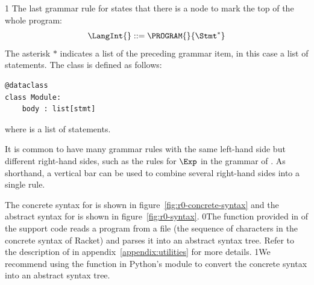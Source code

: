 \documentclass[7x10]{TimesAPriori_MIT}%
\def\racketEd{0}
\def\pythonEd{1}
\def\edition{1}
\newcommand{\racket}[1]{{\if\edition\racketEd{#1}\fi}}
\newcommand{\pythonColor}[0]{}
\newcommand{\python}[1]{{\if\edition\pythonEd\pythonColor #1\fi}}
\numberwithin{theorem}{chapter}
\numberwithin{definition}{chapter}
\numberwithin{equation}{chapter}
\begin{document}
{\if\edition\pythonEd\pythonColor
The last grammar rule for \LangInt{} states that there is a
 node to mark the top of the whole program:
\[
  \LangInt{} ::= \PROGRAM{}{\Stmt^{*}}
\]
The asterisk $*$ indicates a list of the preceding grammar item, in
this case a list of statements.
%
The  class is defined as follows:
\begin{lstlisting}
@dataclass
class Module:
    body : list[stmt]
\end{lstlisting}
where  is a list of statements.
\fi}

It is common to have many grammar rules with the same left-hand side
but different right-hand sides, such as the rules for $\Exp$ in the
grammar of \LangInt{}. As shorthand, a vertical bar can be used to
combine several right-hand sides into a single rule.

The concrete syntax for \LangInt{} is shown in
figure~\ref{fig:r0-concrete-syntax} and the abstract syntax for
\LangInt{} is shown in figure~\ref{fig:r0-syntax}. %
%
\racket{The  function provided in
  \code{utilities.rkt} of the support code reads a program from a file
  (the sequence of characters in the concrete syntax of Racket) and
  parses it into an abstract syntax tree. Refer to the description of
  \code{read-program} in appendix~\ref{appendix:utilities} for more
  details.}
%
\python{We recommend using the  function in Python's
  \code{ast} module to convert the concrete syntax into an abstract
  syntax tree.}

\newcommand{\LintGrammarRacket}{
  \begin{array}{rcl}
    \Type &::=& \key{Integer} \\
    \Exp{} &::=& \Int{} \MID \CREAD \MID \CNEG{\Exp} \MID \CADD{\Exp}{\Exp}
      \MID \CSUB{\Exp}{\Exp}
  \end{array}
}
\newcommand{\LintASTRacket}{
  \begin{array}{rcl}
    \Type &::=& \key{Integer} \\
    \Exp{} &::=& \INT{\Int} \MID \READ{} \\
           &\MID& \NEG{\Exp} \MID \ADD{\Exp}{\Exp} \MID \SUB{\Exp}{\Exp}
  \end{array}
}
\newcommand{\LintGrammarPython}{
\begin{array}{rcl}
  \Exp &::=& \Int \MID \key{input\_int}\LP\RP \MID \key{-}\;\Exp \MID \Exp \; \key{+} \; \Exp \MID \Exp \; \key{-} \; \Exp \MID \LP\Exp\RP \\
  \Stmt &::=& \key{print}\LP \Exp \RP \MID \Exp
\end{array}
}
\newcommand{\LintASTPython}{
  \begin{array}{rcl}
  \Exp{} &::=& \INT{\Int} \MID \READ{} \\
         &\MID& \UNIOP{\key{USub()}}{\Exp} \MID \BINOP{\Exp}{\key{Add()}}{\Exp}\\
         &\MID& \BINOP{\Exp}{\key{Sub()}}{\Exp}\\
  \Stmt{} &::=& \PRINT{\Exp} \MID \EXPR{\Exp} 
\end{array}
}
\end{document}
